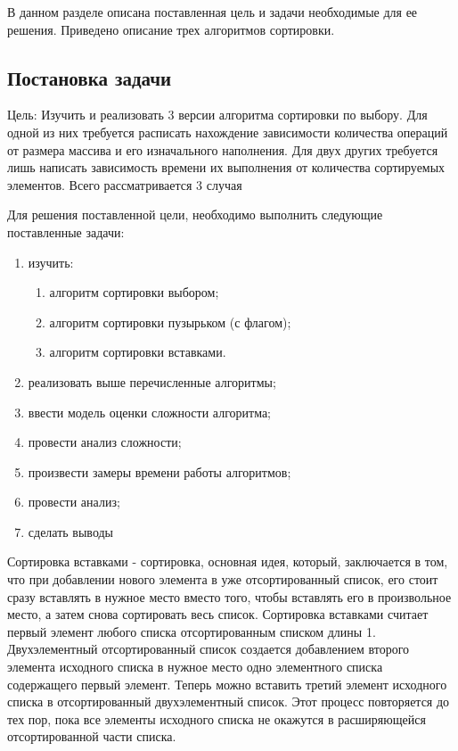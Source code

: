 В данном разделе описана поставленная цель и задачи необходимые для ее решения. Приведено описание трех алгоритмов сортировки. 

\subsection{Постановка задачи}
	
	Цель: Изучить и реализовать 3 версии алгоритма сортировки по выбору. Для одной из них требуется расписать нахождение зависимости количества	операций от размера массива и его изначального наполнения. Для двух других требуется лишь написать зависимость времени их выполнения от количества сортируемых элементов. Всего рассматривается 3 случая
	
	Для решения поставленной цели, необходимо выполнить следующие поставленные задачи:
	
	\begin{enumerate}[1)]
		\item изучить:
		\begin{enumerate}
			\item алгоритм сортировки выбором;
			\item алгоритм сортировки пузырьком (с флагом);
			\item алгоритм сортировки вставками.
		\end{enumerate}
		\item реализовать выше перечисленные алгоритмы;
		\item ввести модель оценки сложности алгоритма;
		\item провести анализ сложности;
		\item произвести замеры времени работы алгоритмов;
		\item провести анализ;
		\item сделать выводы
	\end{enumerate}

	Сортировка вставками \cite{McConnel} - сортировка, основная идея, который, заключается в том, что при добавлении нового элемента в уже отсортированный список, его стоит сразу вставлять в нужное место вместо того, чтобы вставлять его в произвольное место, а затем снова сортировать весь список. 
	Сортировка вставками считает первый элемент любого списка отсортированным списком длины 1.
	Двухэлементный отсортированный список создается добавлением второго элемента исходного списка в нужное место одно элементного списка содержащего первый элемент. 
	Теперь можно вставить третий элемент исходного списка в отсортированный двухэлементный список. 
	Этот процесс повторяется до тех пор, пока все элементы исходного списка не окажутся в расширяющейся отсортированной части списка. \\
	
